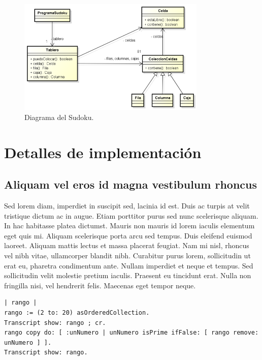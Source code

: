 \documentclass[titlepage,a4paper]{article}
\begin{document}
\begin{figure}[H]
\centering
\includegraphics[width=0.8\textwidth]{diagrama_clase01.png}
\caption{\label{fig:class01}Diagrama del Sudoku.}
\end{figure}

\section{Detalles de implementación}\label{sec:implementacion}

\subsection{Aliquam vel eros id magna vestibulum rhoncus}
Sed lorem diam, imperdiet in suscipit sed, lacinia id est. Duis ac turpis at velit tristique dictum ac in augue. Etiam porttitor purus sed nunc scelerisque aliquam. In hac habitasse platea dictumst. Mauris non mauris id lorem iaculis elementum eget quis mi. Aliquam scelerisque porta arcu sed tempus. Duis eleifend euismod laoreet. Aliquam mattis lectus et massa placerat feugiat. Nam mi nisl, rhoncus vel nibh vitae, ullamcorper blandit nibh. Curabitur purus lorem, sollicitudin ut erat eu, pharetra condimentum ante. Nullam imperdiet et neque et tempus. Sed sollicitudin velit molestie pretium iaculis. Praesent eu tincidunt erat. Nulla non fringilla nisi, vel hendrerit felis. Maecenas eget tempor neque.

\begin{verbatim}
| rango |
rango := (2 to: 20) asOrderedCollection.
Transcript show: rango ; cr.
rango copy do: [ :unNumero | unNumero isPrime ifFalse: [ rango remove: unNumero ] ].
Transcript show: rango.
\end{verbatim}
\end{document}
